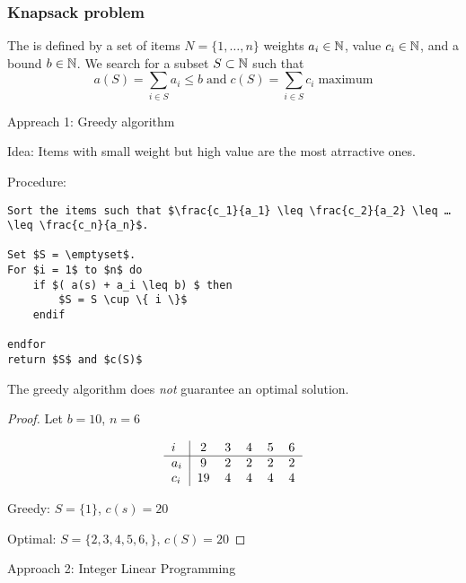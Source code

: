 \begin{lec}[2011-10-26]\end{lec}

\setcounter{section}{6}
\setcounter{subsection}{0}

\subsubsection*{Knapsack problem} 

\begin{defn} %
	The  is defined by a set of items $N = \{ 1, … , n \}$ weights $a_i \in \mathbb{N}$, value $c_i \in \mathbb{N}$, and a bound $b\in \mathbb{N}$. We search for a subset $S\subset \mathbb{N}$ such that 
	\[
		a(S) = \sum_{i \in S} a_i \leq b \; \text{and} \; c(S) = \sum_{i\in S} c_i \; \text{maximum}
	\]
\end{defn}

Appreach 1: Greedy algorithm

Idea: Items with small weight but high value are the most atrractive ones.

Procedure:
\begin{lstlisting}
Sort the items such that $\frac{c_1}{a_1} \leq \frac{c_2}{a_2} \leq … \leq \frac{c_n}{a_n}$.

Set $S = \emptyset$.
For $i = 1$ to $n$ do
	if $( a(s) + a_i \leq b) $ then
		$S = S \cup \{ i \}$
	endif

endfor
return $S$ and $c(S)$
\end{lstlisting}

\begin{thm}
	The greedy algorithm does \emph{ not } guarantee an optimal solution.
\end{thm}

\begin{proof}
	Let $b=10$, $n = 6$
	
	\begin{align*}
		\begin{tabular}{l|ccccc}
			$i$ & 2 & 3 & 4 & 5 & 6 \\ \hline
			$a_i$ & 9 & 2 & 2 & 2 & 2 \\
			$c_i$ &19 & 4 & 4 & 4 & 4
		\end{tabular}
	\end{align*}
	
	Greedy: $S=\{1\}$, $c(s)=20$
	
	Optimal: $S=\{2,3,4,5,6,\}$, $c(S)=20$
\end{proof}

Approach 2: Integer Linear Programming


